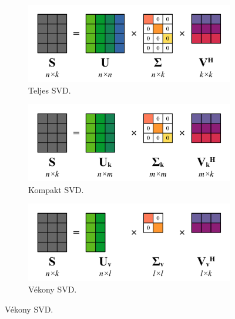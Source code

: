            \begin{figure}[h!]
                \centering
                \begin{subfigure}{0.48\textwidth}
                    \includegraphics[width=\textwidth]{kep/reduced_svd_sajat_1.pdf}
                    \caption{Teljes SVD.}
                    \label{fig:reduced_svd_sajat_1}
                \end{subfigure}
                \begin{subfigure}{0.48\textwidth}
                    \includegraphics[width=\textwidth]{kep/reduced_svd_sajat_2.pdf}
                    \caption{Kompakt SVD.}
                    \label{fig:reduced_svd_sajat_2}
                \end{subfigure}
                \begin{subfigure}{0.48\textwidth}
                    \includegraphics[width=\textwidth]{kep/reduced_svd_sajat_3.pdf}
                    \caption{Vékony SVD.}
                    \label{fig:reduced_svd_sajat_3}
                \end{subfigure}

\end{figure}

